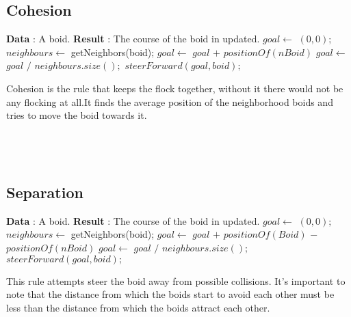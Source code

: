 \documentclass[a4paper]{article}
\begin{document}
\subsection{\textbf{Cohesion}}
\begin{algorithm}
\begin{algorithmic}
\State \textbf{Data} : A boid.
\State \textbf{Result} : The course of the boid in updated.
 \State $goal \gets$ $(0,0);$
 \State $neighbours\gets$ getNeighbors(boid);
         \State $goal \gets$ $goal$ $+$ $positionOf(nBoid)$   
        \EndFor 
           \State $goal \gets$ $goal$ $/$ $neighbours.size();$
              \State $steerForward(goal, boid);$ 
\end{algorithmic}
\end{algorithm}
 Cohesion is the rule that keeps the flock together, without it there would not be any flocking at all.It finds the average position of the neighborhood boids and tries to move the boid towards it.\\
 \\
 \\
 \\
\subsection{Separation}
\begin{algorithm}
\begin{algorithmic}
\State \textbf{Data} : A boid.
\State \textbf{Result} : The course of the boid in updated.
 \State $goal \gets$ $(0,0);$
 \State $neighbours\gets$ getNeighbors(boid);
         \State $goal \gets$ $goal$ $+$ $positionOf(Boid)$ $-$ $positionOf(nBoid)$   
        \EndFor 
           \State $goal \gets$ $goal$ $/$ $neighbours.size();$
              \State $steerForward(goal, boid);$ 
\end{algorithmic}
\end{algorithm}

This rule attempts steer the boid away from possible collisions. It’s important to note that the distance from which the boids start to avoid each other must be less than the distance from which the boids attract each other.
\newpage
\end{document}
